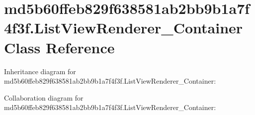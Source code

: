 \hypertarget{classmd5b60ffeb829f638581ab2bb9b1a7f4f3f_1_1_list_view_renderer___container}{}\section{md5b60ffeb829f638581ab2bb9b1a7f4f3f.\+List\+View\+Renderer\+\_\+\+Container Class Reference}
\label{classmd5b60ffeb829f638581ab2bb9b1a7f4f3f_1_1_list_view_renderer___container}


Inheritance diagram for md5b60ffeb829f638581ab2bb9b1a7f4f3f.\+List\+View\+Renderer\+\_\+\+Container\+:


Collaboration diagram for md5b60ffeb829f638581ab2bb9b1a7f4f3f.\+List\+View\+Renderer\+\_\+\+Container\+:
